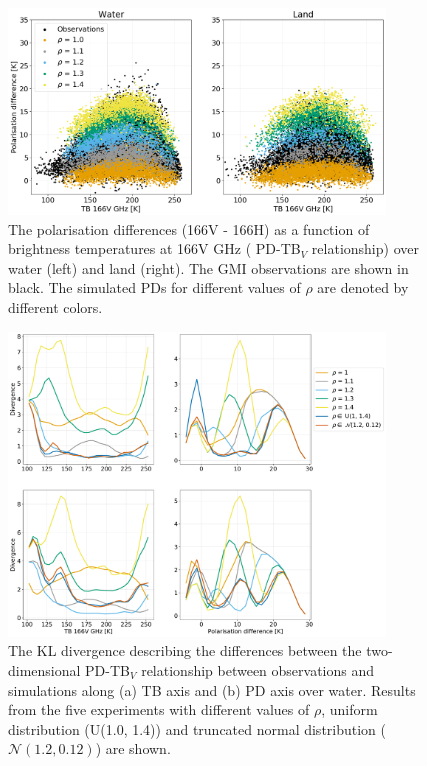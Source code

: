 \documentclass[amt, manuscript]{copernicus}
\begin{document}
\begin{figure}[t]
	\includegraphics[width=10cm]{Figures/PD_water_varying_rho_water_land.png}
	\caption{The polarisation differences (166V - 166H) as a function of brightness temperatures at 166V GHz ( PD-TB$_V$ relationship) over water (left) and land (right). The GMI observations are shown in black. The simulated PDs for different values of $\rho$ are denoted by different colors. }
	\label{fig:PD_166}
\end{figure}
\begin{figure}[t]
	\includegraphics[width=10cm]{Figures/divergence_land_water.pdf}
	\caption{The KL divergence describing the differences between the two-dimensional PD-TB$_V$ relationship between observations and simulations along (a) TB axis and (b) PD axis over water. Results from the five experiments with different values of $\rho$, uniform distribution (U(1.0, 1.4)) and truncated normal distribution ($\mathcal{N(1.2, 0.12)}$) are shown. }
	\label{fig:divergence_PD_land_water}
\end{figure}



\end{document}

